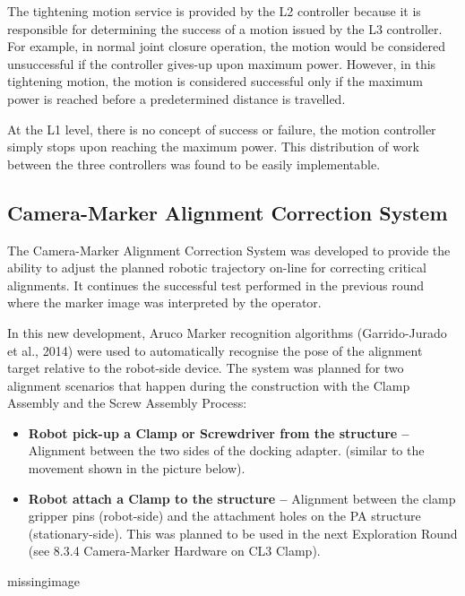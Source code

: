 The tightening motion service is provided by the L2 controller because it is responsible for determining the success of a motion issued by the L3 controller. For example, in normal joint closure operation, the motion would be considered unsuccessful if the controller gives-up upon maximum power. However, in this tightening motion, the motion is considered successful only if the maximum power is reached before a predetermined distance is travelled. 

At the L1 level, there is no concept of success or failure, the motion controller simply stops upon reaching the maximum power. This distribution of work between the three controllers was found to be easily implementable.

\subsection{Camera-Marker Alignment Correction System}
\label{subsection:exploration_4_camera_marker_alignment_correction_system}

The Camera-Marker Alignment Correction System was developed to provide the ability to adjust the planned robotic trajectory on-line for correcting critical alignments. It continues the successful test performed in the previous round  where the marker image was interpreted by the operator. 

In this new development, Aruco Marker recognition algorithms (Garrido-Jurado et al., 2014) were used to automatically recognise the pose of the alignment target relative to the robot-side device. The system was planned for two alignment scenarios that happen during the construction with the Clamp Assembly and the Screw Assembly Process:

\begin{itemize}
    \item \textbf{Robot pick-up a Clamp or Screwdriver from the structure --} Alignment between the two sides of the docking adapter. (similar to the movement shown in the picture below).
    \item \textbf{Robot attach a Clamp to the structure --} Alignment between the clamp gripper pins (robot-side) and the attachment holes on the PA structure (stationary-side). This was planned to be used in the next Exploration Round (see 8.3.4 Camera-Marker Hardware on CL3 Clamp).
\end{itemize}

missingimage

